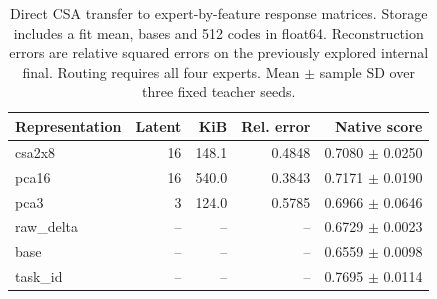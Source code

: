 \begin{table}[htbp]\centering\small
\caption{Direct CSA transfer to expert-by-feature response matrices. Storage includes a fit mean, bases and 512 codes in float64. Reconstruction errors are relative squared errors on the previously explored internal final. Routing requires all four experts. Mean $\pm$ sample SD over three fixed teacher seeds.}
\begin{tabular}{lrrrr}\toprule
Representation & Latent & KiB & Rel. error & Native score \\ \midrule
csa2x8 & 16 & 148.1 & 0.4848 & 0.7080 $\pm$ 0.0250 \\
pca16 & 16 & 540.0 & 0.3843 & 0.7171 $\pm$ 0.0190 \\
pca3 & 3 & 124.0 & 0.5785 & 0.6966 $\pm$ 0.0646 \\
raw\_delta & -- & -- & -- & 0.6729 $\pm$ 0.0023 \\
base & -- & -- & -- & 0.6559 $\pm$ 0.0098 \\
task\_id & -- & -- & -- & 0.7695 $\pm$ 0.0114 \\
\bottomrule\end{tabular}\end{table}
